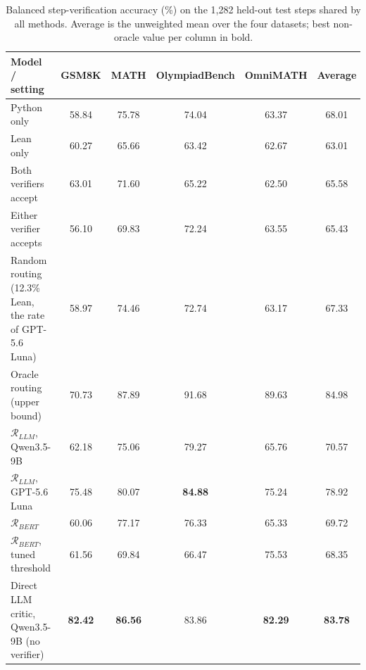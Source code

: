 \begin{table}[ht]
\centering
\begin{tabular}{lccccc}
\hline
\textbf{Model / setting} & \textbf{GSM8K} & \textbf{MATH} & \textbf{OlympiadBench} & \textbf{OmniMATH} & \textbf{Average} \\
\hline
Python only & 58.84 & 75.78 & 74.04 & 63.37 & 68.01 \\
Lean only & 60.27 & 65.66 & 63.42 & 62.67 & 63.01 \\
Both verifiers accept & 63.01 & 71.60 & 65.22 & 62.50 & 65.58 \\
Either verifier accepts & 56.10 & 69.83 & 72.24 & 63.55 & 65.43 \\
Random routing (12.3\% Lean, the rate of GPT-5.6 Luna) & 58.97 & 74.46 & 72.74 & 63.17 & 67.33 \\
Oracle routing (upper bound) & 70.73 & 87.89 & 91.68 & 89.63 & 84.98 \\
\midrule
$\mathcal{R}_{LLM}$, Qwen3.5-9B & 62.18 & 75.06 & 79.27 & 65.76 & 70.57 \\
$\mathcal{R}_{LLM}$, GPT-5.6 Luna & 75.48 & 80.07 & \textbf{84.88} & 75.24 & 78.92 \\
$\mathcal{R}_{BERT}$ & 60.06 & 77.17 & 76.33 & 65.33 & 69.72 \\
$\mathcal{R}_{BERT}$, tuned threshold & 61.56 & 69.84 & 66.47 & 75.53 & 68.35 \\
Direct LLM critic, Qwen3.5-9B (no verifier) & \textbf{82.42} & \textbf{86.56} & 83.86 & \textbf{82.29} & \textbf{83.78} \\
\hline
\end{tabular}
\caption{Balanced step-verification accuracy (\%) on the 1,282 held-out test steps shared by all methods. Average is the unweighted mean over the four datasets; best non-oracle value per column in bold.}
\label{tab:test_split_results}
\end{table}
